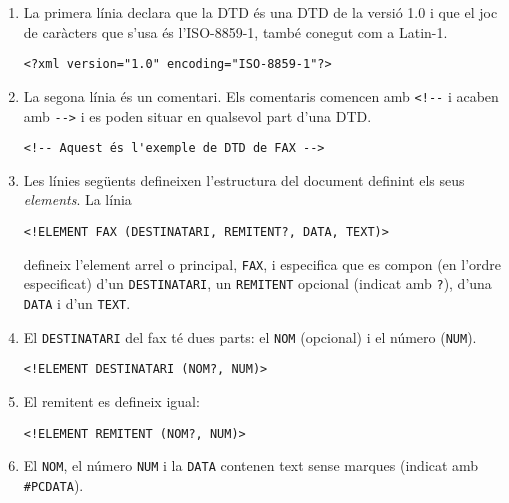 \begin{enumerate}
\item La primera línia declara que la DTD és una DTD de la versió
1.0 i que el joc de caràcters que s'usa és l'ISO-8859-1, també
conegut com a Latin-1.
\begin{small}\begin{verbatim}
<?xml version="1.0" encoding="ISO-8859-1"?>
\end{verbatim}\end{small}
\item La segona línia és un comentari. Els comentaris comencen amb
  \verb+<!--+ i acaben amb \verb+-->+ i es poden situar en qualsevol
  part d'una DTD.
\begin{small}\begin{verbatim}
<!-- Aquest és l'exemple de DTD de FAX -->
\end{verbatim}\end{small}
\item Les línies següents defineixen l'estructura del document
  definint els seus \emph{elements}. La línia
\begin{small}\begin{verbatim}
<!ELEMENT FAX (DESTINATARI, REMITENT?, DATA, TEXT)>
\end{verbatim}\end{small}
defineix l'element arrel o principal, \texttt{FAX}, i especifica que
es compon (en l'ordre especificat) d'un \texttt{DESTINATARI}, un
\texttt{REMITENT} opcional (indicat amb \texttt{?}), d'una \texttt{DATA} i d'un
\texttt{TEXT}. 
\item El \texttt{DESTINATARI} del fax té dues parts: el \texttt{NOM}
  (opcional) i el número (\texttt{NUM}).
\begin{small}\begin{verbatim}
<!ELEMENT DESTINATARI (NOM?, NUM)>
\end{verbatim}\end{small}
\item El remitent es defineix igual:
\begin{small}\begin{verbatim}
<!ELEMENT REMITENT (NOM?, NUM)>
\end{verbatim}\end{small}
\item El \texttt{NOM}, el número \texttt{NUM} i la \texttt{DATA}
  contenen text sense marques (indicat amb \verb+#PCDATA+).
\begin{small}\begin{verbatim}

\end{verbatim}
\end{small}
\end{enumerate}
